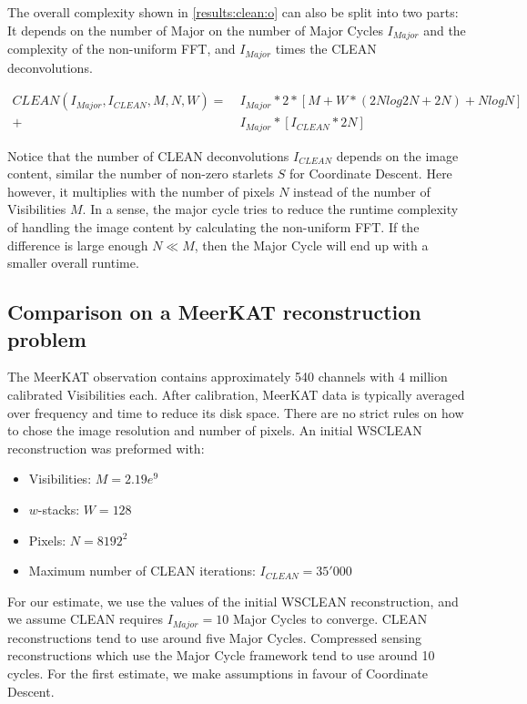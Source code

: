 The overall complexity shown in \eqref{results:clean:o} can also be split into two parts: It depends on the number of Major on the number of Major Cycles $I_{Major}$ and the complexity of the non-uniform FFT, and $I_{Major}$ times the CLEAN deconvolutions. 

\begin{equation}\label{results:clean:o}
\begin{aligned}
 CLEAN(I_{Major}, I_{CLEAN}, M, N,  W) =\: &I_{Major} * 2 * [M + W*(2N log 2N + 2N) + N log N]\\
+ &I_{Major} * [I_{CLEAN}*2N]
\end{aligned}
\end{equation}

Notice that the number of CLEAN deconvolutions $I_{CLEAN}$ depends on the image content, similar the number of non-zero starlets $S$ for Coordinate Descent. Here however, it multiplies with the number of pixels $N$ instead of the number of Visibilities $M$. In a sense, the major cycle tries to reduce the runtime complexity of handling the image content by calculating the non-uniform FFT. If the difference is large enough $N \ll M$, then the Major Cycle will end up with a smaller overall runtime.


\subsection{Comparison on a MeerKAT reconstruction problem}
The MeerKAT observation contains approximately 540 channels with 4 million calibrated Visibilities each. After calibration, MeerKAT data is typically averaged over frequency and time to reduce its disk space. There are no strict rules on how to chose the image resolution and number of pixels. An initial WSCLEAN reconstruction was preformed with:
\begin{itemize}
	\item Visibilities: $M=2.19e^9$
	\item $w$-stacks: $W = 128$
	\item Pixels: $N = 8192^2$
	\item Maximum number of CLEAN iterations: $I_{CLEAN} = 35'000$
\end{itemize}

For our estimate, we use the values of the initial WSCLEAN reconstruction, and we assume CLEAN requires $I_{Major}=10$ Major Cycles to converge. CLEAN reconstructions tend to use around five Major Cycles. Compressed sensing reconstructions which use the Major Cycle framework tend to use around 10 cycles. For the first estimate, we make assumptions in favour of Coordinate Descent.

